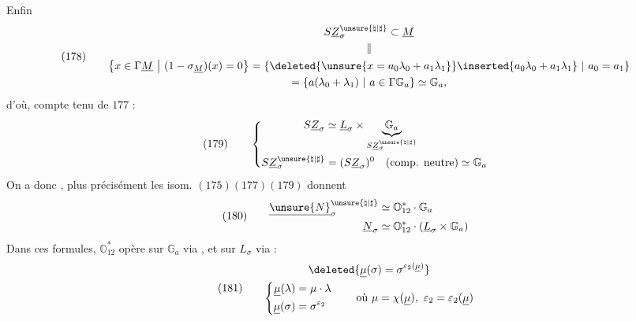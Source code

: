 Enfin
\[
(178)\qquad
\begin{gathered}
S\underline Z_\sigma^{\unsure{\natural|\sharp}}\subset\underline M\\
\parallel\\
\left\{x\in\Gamma\underline M\ \middle|\ (1-\sigma_{\underline M})(x)=0\right\}
=\left\{
\deleted{\unsure{x=a_0\lambda_0+a_1\lambda_1}}
\inserted{a_0\lambda_0+a_1\lambda_1}
\ \middle|\ a_0=a_1
\right\}\\
=\left\{a(\lambda_0+\lambda_1)\ \middle|\ a\in\Gamma\mathbb G_a\right\}
\simeq\mathbb G_a,
\end{gathered}
\]
d'où, compte tenu de \(177\) :
\[
(179)\qquad
\left\{
\begin{aligned}
S\underline Z_\sigma
&\simeq\underline L_\sigma\times
\underbrace{\mathbb G_a}_{S\underline Z_\sigma^{\unsure{\natural|\sharp}}}\\
S\underline Z_\sigma^{\unsure{\natural|\sharp}}
&=(S\underline Z_\sigma)^0
\quad\text{(comp. neutre)}\simeq\mathbb G_a
\end{aligned}
\right.
\]
On a donc
,
plus précisément les isom. \((175)(177)(179)\) donnent
\[
(180)\qquad
\begin{aligned}
\underline{\unsure{N}}_\sigma^{\unsure{\natural|\sharp}}
&\simeq\mathbb O_{12}^{*}\cdot\mathbb G_a\\
\underline N_\sigma
&\simeq\mathbb O_{12}^{*}\cdot
(\underline L_\sigma\times\mathbb G_a)
\end{aligned}
\]
Dans ces formules, \(\mathbb O_{12}^{*}\) opère sur \(\mathbb G_a\)
via
,
et sur \(L_\sigma\) via
 :
\[
(181)\qquad
\begin{gathered}
\deleted{\underline\mu(\sigma)=\sigma^{\varepsilon_2(\underline\mu)}}\\
\left\{
\begin{aligned}
\underline\mu(\lambda)&=\mu\cdot\lambda\\
\underline\mu(\sigma)&=\sigma^{\varepsilon_2}
\end{aligned}
\right.
\qquad\text{où }\mu=\chi(\underline\mu),\ \varepsilon_2=\varepsilon_2(\underline\mu)
\end{gathered}
\]

